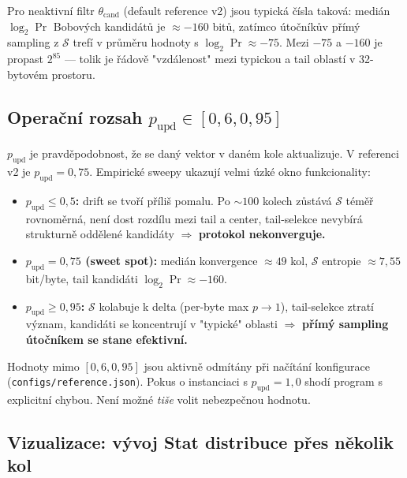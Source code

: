 \documentclass[11pt,a4paper]{article}
\begin{document}
Pro neaktivní filtr $\theta_\text{cand}$ (default reference v2) jsou typická čísla taková: medián $\log_2 \Pr$ Bobových kandidátů je $\approx -160$ bitů, zatímco útočníkův přímý sampling z $\mathcal{S}$ trefí v průměru hodnoty s $\log_2 \Pr \approx -75$. Mezi $-75$ a $-160$ je propast $2^{85}$ --- tolik je řádově "vzdálenost" mezi typickou a tail oblastí v 32-bytovém prostoru.

\subsection{Operační rozsah \texorpdfstring{$p_\text{upd} \in [0{,}6, 0{,}95]$}{p\_upd in [0.6, 0.95]}}

$p_\text{upd}$ je pravděpodobnost, že se daný vektor v daném kole aktualizuje. V referenci v2 je $p_\text{upd} = 0{,}75$. Empirické sweepy ukazují velmi úzké okno funkcionality:

\begin{itemize}[leftmargin=*]
\item \textbf{$p_\text{upd} \leq 0{,}5$:} drift se tvoří příliš pomalu. Po $\sim 100$ kolech zůstává $\mathcal{S}$ téměř rovnoměrná, není dost rozdílu mezi tail a center, tail-selekce nevybírá strukturně oddělené kandidáty $\Rightarrow$ \textbf{protokol nekonverguje.}
\item \textbf{$p_\text{upd} = 0{,}75$ (sweet spot):} medián konvergence $\approx 49$ kol, $\mathcal{S}$ entropie $\approx 7{,}55$ bit/byte, tail kandidáti $\log_2 \Pr \approx -160$.
\item \textbf{$p_\text{upd} \geq 0{,}95$:} $\mathcal{S}$ kolabuje k delta (per-byte max $p \to 1$), tail-selekce ztratí význam, kandidáti se koncentrují v "typické" oblasti $\Rightarrow$ \textbf{přímý sampling útočníkem se stane efektivní.}
\end{itemize}

\begin{warning}
Hodnoty mimo $[0{,}6, 0{,}95]$ jsou aktivně odmítány při načítání konfigurace (\texttt{configs/reference.json}). Pokus o instanciaci s $p_\text{upd} = 1{,}0$ shodí program s explicitní chybou. Není možné \emph{tiše} volit nebezpečnou hodnotu.
\end{warning}

\subsection{Vizualizace: vývoj Stat distribuce přes několik kol}
\end{document}
